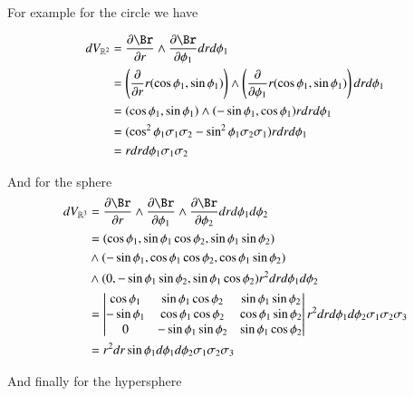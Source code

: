 For example for the circle we have

\begin{align*}
dV_{\Rm{2}}
&= \PD{r}{\Br} \wedge \PD{\phi_1}{\Br} dr d\phi_1 \\
&= \left(\PD{r}{}r(\cos\phi_1, \sin\phi_1) \right) \wedge \left(\PD{\phi_1}{}r(\cos\phi_1, \sin\phi_1) \right) dr d\phi_1 \\
&= (\cos\phi_1, \sin\phi_1) \wedge (-\sin\phi_1, \cos\phi_1) r dr d\phi_1 \\
&= (\cos^2\phi_1 \sigma_1 \sigma_2 - \sin^2\phi_1 \sigma_2 \sigma_1 ) r dr d\phi_1 \\
&= r dr d\phi_1 \sigma_1 \sigma_2 \\
\end{align*}

And for the sphere
\begin{align*}
dV_{\Rm{3}}
&= \PD{r}{\Br} \wedge \PD{\phi_1}{\Br} \wedge \PD{\phi_2}{\Br} dr d\phi_1 d\phi_2 \\
&= (\cos\phi_1, \sin\phi_1 \cos\phi_2, \sin\phi_1 \sin\phi_2)  \\
&\wedge (-\sin\phi_1, \cos\phi_1 \cos\phi_2, \cos\phi_1 \sin\phi_2)  \\
&\wedge (0, -\sin\phi_1 \sin\phi_2, \sin\phi_1 \cos\phi_2) r^2 dr d\phi_1 d\phi_2 \\
&= 
\begin{vmatrix}
\cos\phi_1 & \sin\phi_1 \cos\phi_2 & \sin\phi_1 \sin\phi_2  \\
-\sin\phi_1 & \cos\phi_1 \cos\phi_2 & \cos\phi_1 \sin\phi_2  \\
0 & -\sin\phi_1 \sin\phi_2 & \sin\phi_1 \cos\phi_2  \\
\end{vmatrix} r^2 dr d\phi_1 d\phi_2 \sigma_1 \sigma_2 \sigma_3 \\
&=
r^2 dr \sin\phi_1 d\phi_1 d\phi_2 \sigma_1 \sigma_2 \sigma_3 \\
\end{align*}

And finally for the hypersphere

